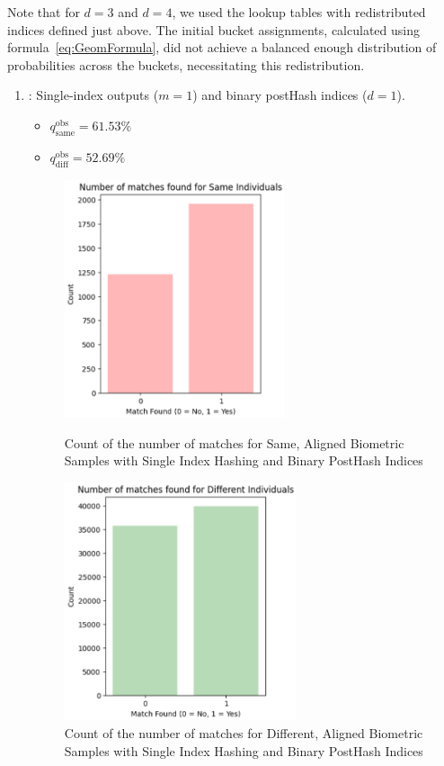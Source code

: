 Note that for \(d = 3\) and \(d = 4\), we used the lookup tables with redistributed indices defined just above. The initial bucket assignments, calculated using formula~\ref{eq:GeomFormula}, did not achieve a balanced enough distribution of probabilities across the buckets, necessitating this redistribution.

\begin{enumerate}
    \item {}: Single-index outputs (\(m=1\)) and binary postHash indices (\(d=1\)).
    \begin{itemize}
        \item \(q_{\text{same}}^{\text{obs}} = 61.53\%\)
        \item \(q_{\text{diff}}^{\text{obs}} = 52.69\%\)
    \end{itemize}

    \begin{figure}[H]
        \centering
        \begin{minipage}[b]{0.48\linewidth}
            \centering
            \includegraphics[width=\linewidth,height=7cm,keepaspectratio]{latex-img/d1same.png}
            \caption{Count of the number of matches for Same, Aligned Biometric Samples with Single Index Hashing and Binary PostHash Indices}
            \label{mu_same}
        \end{minipage}
        \hfill
        \begin{minipage}[b]{0.48\linewidth}
            \centering
            \includegraphics[width=\linewidth,height=7cm,keepaspectratio]{latex-img/d1diff.png}
            \caption{Count of the number of matches for Different, Aligned Biometric Samples with Single Index Hashing and Binary PostHash Indices}
            \label{mu_diff}
        \end{minipage}
    \end{figure}
    

\end{enumerate}
